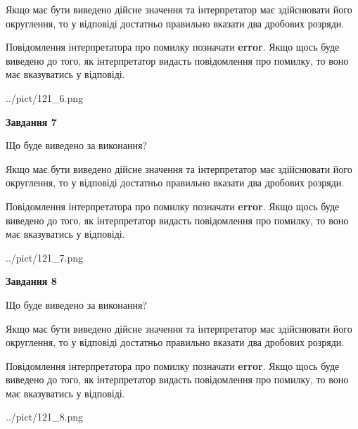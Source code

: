 \documentclass[12pt, ukrainian]{article}
\begin{document}
{\begin {Large}
Якщо має бути виведено дійсне значення та інтерпретатор має здійснювати його округлення, 
то у відповіді достатньо правильно вказати два дробових розряди.

Повідомлення інтерпретатора про помилку позначати \textbf{error}.
Якщо щось буде виведено до того, як інтерпретатор видасть повідомлення про помилку, 
то воно має вказуватись у відповіді. \par

\begin{center}
	{../pict/121_6.png}
\end{center}
\newpage

{\begin {center}\textbf{Завдання 7}\end {center}}\par
Що буде виведено за виконання? \par

Якщо має бути виведено дійсне значення та інтерпретатор має здійснювати його округлення, 
то у відповіді достатньо правильно вказати два дробових розряди.

Повідомлення інтерпретатора про помилку позначати \textbf{error}.
Якщо щось буде виведено до того, як інтерпретатор видасть повідомлення про помилку, 
то воно має вказуватись у відповіді. \par

\begin{center}
	{../pict/121_7.png}
\end{center}
\newpage

{\begin {center}\textbf{Завдання 8}\end {center}}\par
Що буде виведено за виконання? \par

Якщо має бути виведено дійсне значення та інтерпретатор має здійснювати його округлення, 
то у відповіді достатньо правильно вказати два дробових розряди.

Повідомлення інтерпретатора про помилку позначати \textbf{error}.
Якщо щось буде виведено до того, як інтерпретатор видасть повідомлення про помилку, 
то воно має вказуватись у відповіді. \par

\begin{center}
	{../pict/121_8.png}
\end{center}
\newpage


\end{Large}}
\end{document}
